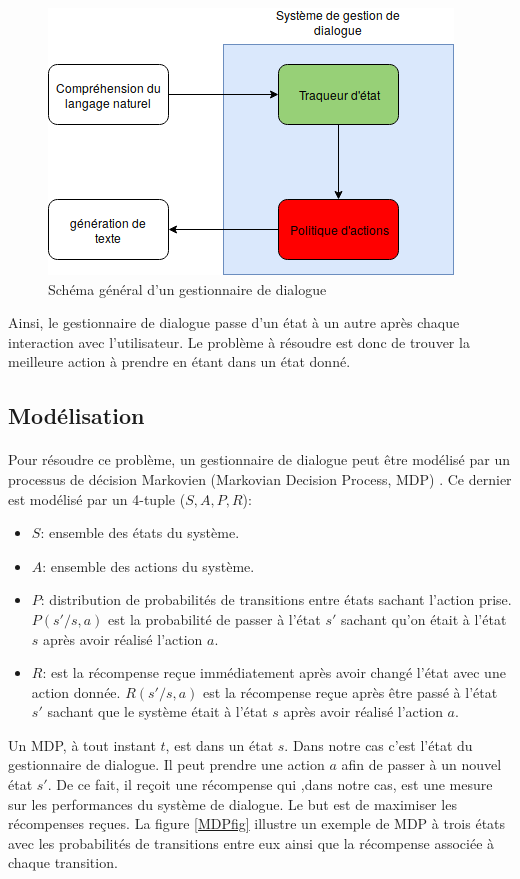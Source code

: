 \begin{figure}[H]
	\centering
	\includegraphics[width=.7\linewidth]{images/DM/DMGeneral.png} 
	\caption{Schéma général d'un gestionnaire de dialogue}\label{DMGeneral}
\end{figure}
\par Ainsi, le gestionnaire de dialogue passe d'un état à un autre après chaque interaction avec l'utilisateur. Le problème à résoudre est donc de trouver la meilleure action à prendre en étant dans un état donné.
\subsection{Modélisation}\label{MDP}
\paragraph{}Pour résoudre ce problème, un gestionnaire de dialogue peut être modélisé par un processus de décision Markovien (Markovian Decision Process, MDP) \citep{Bel1957}. Ce dernier est modélisé par un 4-tuple ($S,A,P,R$):
\begin{itemize}
	\item $S$: ensemble des états du système.
	\item $A$: ensemble des actions du système.
	\item $P$: distribution de probabilités de transitions entre états sachant l'action prise. $P(s'/s,a)$ est la probabilité de passer à l'état $s'$ sachant qu'on était à l'état $s$ après avoir réalisé l'action $a$.
	\item $R$: est la récompense reçue immédiatement après avoir changé l'état avec une action donnée. $R(s'/s,a)$ est la récompense reçue après être passé à l'état $s'$ sachant que le système était à l'état $s$ après avoir réalisé l'action $a$.
\end{itemize}
Un MDP, à tout instant $t$, est dans un état $s$. Dans notre cas c'est l'état du gestionnaire de dialogue. Il peut prendre une action $a$ afin de passer à un nouvel état $s'$. De ce fait, il reçoit une récompense qui ,dans notre cas, est une mesure sur les performances du système de dialogue. Le but est de maximiser les récompenses reçues. La figure \ref{MDPfig} illustre un exemple de MDP à trois états avec les probabilités de transitions entre eux ainsi que la récompense associée à chaque transition.

